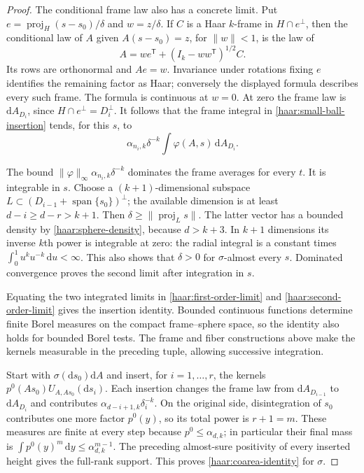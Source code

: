 \begin{proof}
The conditional frame law also has a concrete limit.  Put
$e=\operatorname{proj}_H(s-s_0)/\delta$ and $w=z/\delta$.  If $C$ is a
Haar $k$-frame in $H\cap e^\perp$, then the conditional law of $A$ given
$A(s-s_0)=z$, for $\lVert w\rVert<1$, is the law of
\begin{equation}\label{haar:conditional-frame}
 A=w e^{\mathsf T}+(I_k-ww^{\mathsf T})^{1/2}C.
\end{equation}
Its rows are orthonormal and $Ae=w$.  Invariance under rotations fixing
$e$ identifies the remaining factor as Haar; conversely the displayed
formula describes every such frame.  The formula is continuous at $w=0$.
At zero the frame law is $\mathrm dA_{D_i}$, since
$H\cap e^\perp=D_i^\perp$.  It follows that the frame integral in
\eqref{haar:small-ball-insertion} tends, for this $s$, to
\begin{equation}\label{haar:second-order-limit}
 \alpha_{n_i,k}\delta^{-k}
       \int\varphi(A,s)\,\mathrm dA_{D_i}.
\end{equation}

The bound $\lVert\varphi\rVert_\infty\alpha_{n_i,k}\delta^{-k}$
dominates the frame averages for every $t$.  It is integrable in $s$.
Choose a $(k+1)$-dimensional subspace
$L\subset(D_{i-1}+\operatorname{span}\{s_0\})^\perp$; the available
dimension is at least $d-i\ge d-r>k+1$.  Then
$\delta\ge\lVert\operatorname{proj}_L s\rVert$.  The latter vector has
a bounded density by \eqref{haar:sphere-density}, because $d>k+3$.
In $k+1$ dimensions its inverse $k$th power is integrable at zero:
the radial integral is a constant times
$\int_0^1 u^k u^{-k}\,\mathrm du<\infty$.  This also shows that
$\delta>0$ for $\sigma$-almost every $s$.  Dominated convergence proves
the second limit after integration in $s$.

Equating the two integrated limits in \eqref{haar:first-order-limit} and
\eqref{haar:second-order-limit} gives the insertion identity.  Bounded
continuous functions determine finite Borel measures on the compact
frame--sphere space, so the identity also holds for bounded Borel tests.
The frame and fiber constructions above make the kernels measurable in
the preceding tuple, allowing successive integration.

Start with $\sigma(\mathrm ds_0)\mathrm dA$ and insert, for
$i=1,\ldots,r$, the kernels
$p^0(As_0)U_{A,As_0}(\mathrm ds_i)$.  Each insertion changes the frame
law from $\mathrm dA_{D_{i-1}}$ to $\mathrm dA_{D_i}$ and contributes
$\alpha_{d-i+1,k}\delta_i^{-k}$.  On the original side, disintegration
of $s_0$ contributes one more factor $p^0(y)$, so its total power is
$r+1=m$.  These measures are finite at every step because
$p^0\le\alpha_{d,k}$; in particular their final mass is
$\int p^0(y)^m\,\mathrm dy\le\alpha_{d,k}^{m-1}$.  The preceding
almost-sure positivity of every inserted height gives the full-rank
support.  This proves \eqref{haar:coarea-identity} for $\sigma$.


\end{proof}
